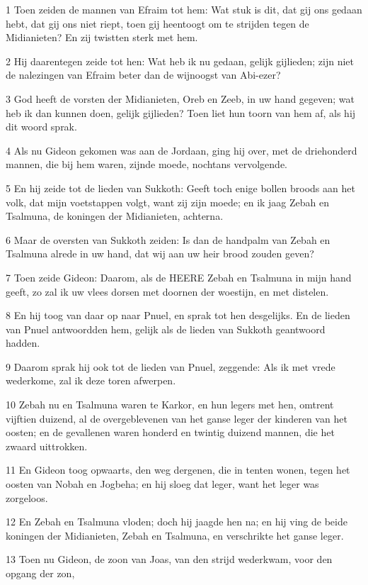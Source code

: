 \par 1 Toen zeiden de mannen van Efraim tot hem: Wat stuk is dit, dat gij ons gedaan hebt, dat gij ons niet riept, toen gij heentoogt om te strijden tegen de Midianieten? En zij twistten sterk met hem.
\par 2 Hij daarentegen zeide tot hen: Wat heb ik nu gedaan, gelijk gijlieden; zijn niet de nalezingen van Efraim beter dan de wijnoogst van Abi-ezer?
\par 3 God heeft de vorsten der Midianieten, Oreb en Zeeb, in uw hand gegeven; wat heb ik dan kunnen doen, gelijk gijlieden? Toen liet hun toorn van hem af, als hij dit woord sprak.
\par 4 Als nu Gideon gekomen was aan de Jordaan, ging hij over, met de driehonderd mannen, die bij hem waren, zijnde moede, nochtans vervolgende.
\par 5 En hij zeide tot de lieden van Sukkoth: Geeft toch enige bollen broods aan het volk, dat mijn voetstappen volgt, want zij zijn moede; en ik jaag Zebah en Tsalmuna, de koningen der Midianieten, achterna.
\par 6 Maar de oversten van Sukkoth zeiden: Is dan de handpalm van Zebah en Tsalmuna alrede in uw hand, dat wij aan uw heir brood zouden geven?
\par 7 Toen zeide Gideon: Daarom, als de HEERE Zebah en Tsalmuna in mijn hand geeft, zo zal ik uw vlees dorsen met doornen der woestijn, en met distelen.
\par 8 En hij toog van daar op naar Pnuel, en sprak tot hen desgelijks. En de lieden van Pnuel antwoordden hem, gelijk als de lieden van Sukkoth geantwoord hadden.
\par 9 Daarom sprak hij ook tot de lieden van Pnuel, zeggende: Als ik met vrede wederkome, zal ik deze toren afwerpen.
\par 10 Zebah nu en Tsalmuna waren te Karkor, en hun legers met hen, omtrent vijftien duizend, al de overgeblevenen van het ganse leger der kinderen van het oosten; en de gevallenen waren honderd en twintig duizend mannen, die het zwaard uittrokken.
\par 11 En Gideon toog opwaarts, den weg dergenen, die in tenten wonen, tegen het oosten van Nobah en Jogbeha; en hij sloeg dat leger, want het leger was zorgeloos.
\par 12 En Zebah en Tsalmuna vloden; doch hij jaagde hen na; en hij ving de beide koningen der Midianieten, Zebah en Tsalmuna, en verschrikte het ganse leger.
\par 13 Toen nu Gideon, de zoon van Joas, van den strijd wederkwam, voor den opgang der zon,
